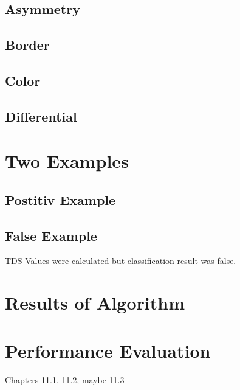 \subsection{Asymmetry}


\subsection{Border}


\subsection{Color}


\subsection{Differential}

\section{Two Examples}
\subsection{Postitiv Example}

\subsection{False Example}

TDS Values were calculated but classification result was false.

\section{Results of Algorithm}



\section{Performance Evaluation}

Chapters 11.1, 11.2, maybe 11.3